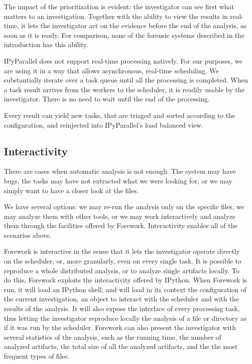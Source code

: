 \documentclass[twoside]{article}
\begin{document}
\begin{multicols}{2}
The impact of the prioritization is evident: the investigator can see first what
matters to an investigation. Together with the ability to view the results
in real-time, it lets the investigator act on the evidence before the end of
the analysis, as soon as it is ready. For comparison, none of the forensic systems
described in the introduction has this ability.

IPyParallel does not support real-time processing natively. For our purposes, we
are using it in a way that allows asynchronous, real-time scheduling.
We substantially iterate over a task queue until all the processing is completed.
When a task result arrives from the workers to the scheduler, it is readily usable
by the investigator. There is no need to wait until the end of the processing.

Every result can yield new tasks, that are triaged and sorted according to the
configuration, and reinjected into IPyParallel's load balanced view.

\subsection*{Interactivity}

There are cases when automatic analysis is not enough. The system may have
bugs, the tasks may have not extracted what we were looking for, or we may
simply want to have a closer look at the files.

We have several options: we may re-run the analysis only on the specific files,
we may analyze them with other tools, or we may work interactively and analyze
them through the facilities offered by Forework. Interactivity enables all of
the scenarios above.

Forework is interactive in the sense that it lets the investigator operate
directly on the scheduler, or, more granularly, even on every single task. It is
possible to reproduce a whole distributed analysis, or to analyze single artifacts
locally. To do this, Forework exploits the interactivity offered by
IPython. When Forework is run, it will load an IPython shell, and will load in its
context the configuration of
the current investigation, an object to interact with the scheduler and with the
results of the analysis. It will also expose the interface of every processing
task, thus letting the investigator reproduce locally the analysis of a file or
directory as if it was run by the scheduler.
Forework can also present the investigator with several statistics of the
analysis, such as the running time, the number of analyzed artifacts, the total
size of all the analyzed artifacts, and the the most frequent types of files.


\end{multicols}
\end{document}

